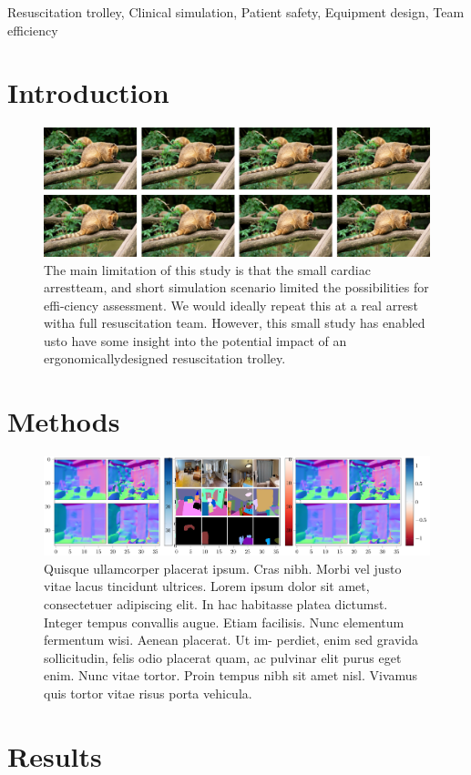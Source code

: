 \documentclass[a4paper,fleqn]{cas-dc}
\begin{document}
\begin{keywords}
Resuscitation trolley\sep
Clinical simulation\sep
Patient safety\sep
Equipment design\sep
Team efficiency
\end{keywords}

\maketitle


\section{Introduction}
\label{Intro}

\lipsum[1-7]


\begin{figure}[t]
	\centering
\includegraphics[width=\textwidth]{fig1-2}
	  \caption{The main limitation of this study is that the small cardiac arrestteam, and short simulation scenario limited the possibilities for effi-ciency assessment. We would ideally repeat this at a real arrest witha full resuscitation team. However, this small study has enabled usto have some insight into the potential impact of an ergonomicallydesigned resuscitation trolley.}
\label{fig1}
\end{figure}


\section{Methods}
\label{Methods}

\begin{figure}[b]
	\centering
\includegraphics[width=\textwidth]{fig2}
	  \caption{Quisque ullamcorper placerat ipsum. Cras nibh. Morbi
vel justo vitae lacus tincidunt ultrices. Lorem ipsum dolor
sit amet, consectetuer adipiscing elit. In hac habitasse platea
dictumst. Integer tempus convallis augue. Etiam facilisis.
Nunc elementum fermentum wisi. Aenean placerat. Ut im-
perdiet, enim sed gravida sollicitudin, felis odio placerat
quam, ac pulvinar elit purus eget enim. Nunc vitae tortor.
Proin tempus nibh sit amet nisl. Vivamus quis tortor vitae
risus porta vehicula.}
\label{fig1}
\end{figure}

\lipsum[1-7]

\section{Results}
\label{Results}

\lipsum[1-7]
\end{document}
